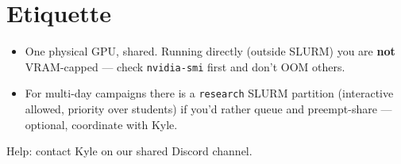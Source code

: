 \documentclass[11pt]{article}
\newcommand{\Contact}{our shared Discord channel}
\newcommand{\code}[1]{\texttt{#1}}
\begin{document}
\section{Etiquette}
\begin{itemize}
  \item One physical GPU, shared. Running directly (outside SLURM) you are \textbf{not} VRAM-capped --- check \code{nvidia-smi} first and don't OOM others.
  \item For multi-day campaigns there is a \code{research} SLURM partition (interactive allowed, priority over students) if you'd rather queue and preempt-share --- optional, coordinate with Kyle.
\end{itemize}

\vspace{0.6cm}
\begin{center}\small Help: contact Kyle on \Contact.\end{center}
\end{document}
